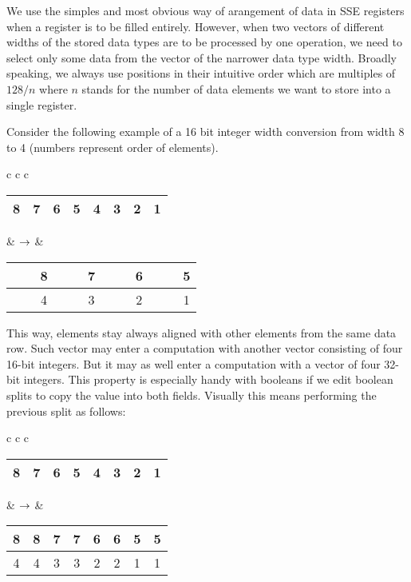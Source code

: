 We use the simples and most obvious way of arangement of data in SSE registers when a register is to be filled entirely. However, when two vectors of different widths of the stored data types are to be processed by one operation, we need to select only some data from the vector of the narrower data type width. Broadly speaking, we always use positions in their intuitive order which are multiples of $128/n$ where $n$ stands for the number of data elements we want to store into a single register. 

Consider the following example of a 16 bit integer width conversion from width 8 to 4 (numbers represent order of elements).


\mybeginfig
\begin{longtable}{ c c c }
  {
\begin{tabular}{|c|c|c|c|c|c|c|c|}
\hline
8 & 7 & 6 & 5 & 4 & 3 & 2 & 1 \tabularnewline
\hline
\end{tabular}
}
&
$\rightarrow$
&
  {
\begin{tabular}{|c|c|c|c|c|c|c|c|}
\hline
\ \ & 8 & \ \ & 7 & \ \ & 6 & \ \ & 5 \tabularnewline
\hline
\ \ & 4 & \ \ & 3 & \ \ & 2 & \ \ & 1 \tabularnewline
\hline
\end{tabular}
}
\end{longtable}

This way, elements stay always aligned with other elements from the same data row. Such vector may enter a computation with another vector consisting of four 16-bit integers. But it may as well enter a computation with a vector of four 32-bit integers. This property is especially handy with booleans if we edit boolean splits to copy the value into both fields. Visually this means performing the previous split as follows:

\mybeginfig
\begin{longtable}{ c c c }
\begin{tabular}{|c|c|c|c|c|c|c|c|}
\hline
8 & 7 & 6 & 5 & 4 & 3 & 2 & 1 \tabularnewline
\hline
\end{tabular}
&
$\rightarrow$
&
\begin{tabular}{|c|c|c|c|c|c|c|c|}
\hline
8 & 8 & 7 & 7 & 6 & 6 & 5 & 5 \tabularnewline
\hline
4  & 4 & 3 & 3 & 2 & 2 & 1 & 1 \tabularnewline
\hline
\end{tabular}
\end{longtable}

